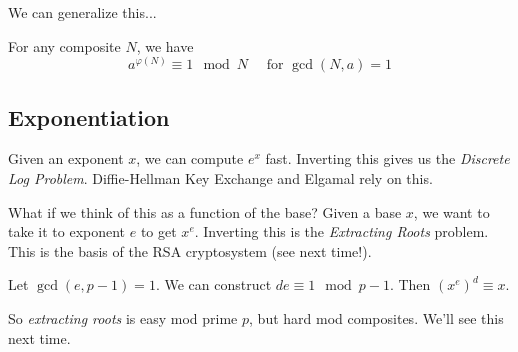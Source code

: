 We can generalize this...
\begin{proposition}
    For any composite $N$, we have
    \[a^{\varphi(N)}\equiv 1\mod N\quad\text{ for }\gcd(N, a) = 1\]
\end{proposition}

\subsection{Exponentiation}
Given an exponent $x$, we can compute $e^x$ fast. Inverting this gives us the \emph{Discrete Log Problem}. Diffie-Hellman Key Exchange and Elgamal rely on this.

What if we think of this as a function of the base? Given a base $x$, we want to take it to exponent $e$ to get $x^e$. Inverting this is the \emph{Extracting Roots} problem. This is the basis of the RSA cryptosystem (see next time!).

\begin{claim*}
    Let $\gcd(e, p-1) = 1$. We can construct $de\equiv 1 \mod p-1$. Then $(x^e)^d\equiv x$.
\end{claim*}

So \emph{extracting roots} is easy mod prime $p$, but hard mod composites. We'll see this next time. 